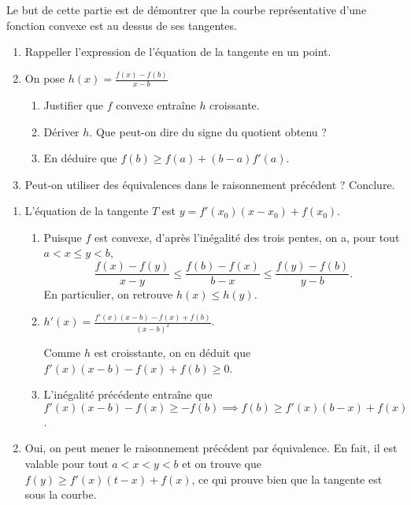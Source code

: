 \documentclass[12pt,a4paper,french]{article}
\theoremstyle{break}
\theoremstyle{plain}
\theoremstyle{nonumberplain}
\theoremstyle{nonumberbreak}
\begin{document}
Le but de cette partie est de démontrer que la courbe représentative
d'une fonction convexe est au dessus de ses tangentes.

\begin{question}[ID=tangentes]
  \begin{enumerate}
    \item Rappeller l'expression de l'équation de la tangente en un
      point.
    \item On pose $h(x) = \frac{f(x) - f(b)}{x -b}$
      \begin{enumerate}
        \item Justifier que $f$ convexe entraîne $h$ croissante.
        \item Dériver $h$. Que peut-on dire du signe du quotient obtenu
          ?
        \item En déduire que $f(b) \geqslant f(a) + (b -a)f'(a)$.
      \end{enumerate}
    \item Peut-on utiliser des équivalences dans le raisonnement
      précédent ? Conclure.
  \end{enumerate}
\end{question}
\begin{solution}
  \begin{enumerate}
    \item L'équation de la tangente $T$ est $y = f'(x_0) (x - x_0) +
      f(x_0)$.
      \begin{enumerate}
        \item Puisque $f$ est convexe, d'après l'inégalité des trois
          pentes, on a, pour tout $a < x \leqslant y < b$, \[ \frac{f(x)
          - f(y)}{x -y} \leqslant \frac{f(b) - f(x)}{b - x} \leqslant
          \frac{f(y) - f(b)}{y -b}. \] En particulier, on retrouve $h(x)
          \leqslant h(y)$.
        \item $h'(x) = \frac{f'(x)(x -b) - f(x) + f(b)}{(x - b)^2}$.

          Comme $h$ est croisstante, on en déduit que $f'(x)(x -b) -
          f(x) + f(b) \geqslant 0$.
        \item L'inégalité précédente entraîne que $f'(x)(x -b) - f(x)
          \geqslant -f(b) \implies f(b) \geqslant f'(x)(b - x) + f(x)$.
      \end{enumerate}
    \item Oui, on peut mener le raisonnement précédent par équivalence.
      En fait, il est valable pour tout $a < x < y < b$ et on trouve que
      $f(y) \geqslant f'(x)(t - x) + f(x)$, ce qui prouve bien que la
      tangente est sous la courbe.
  \end{enumerate}
\end{solution}
\end{document}
